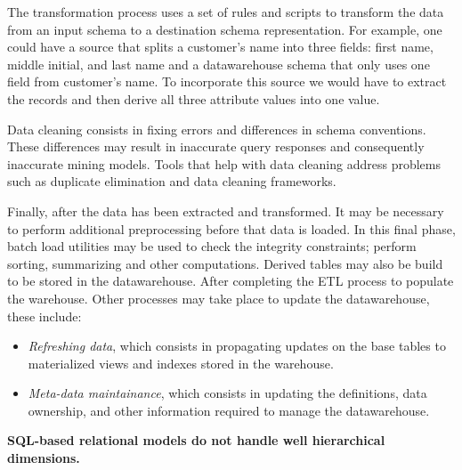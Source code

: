 \documentclass[]{article}
\begin{document}
The transformation process uses a set of rules and scripts to transform the data from an input schema to a destination schema
representation. For example, one could have a source that splits a customer's name into three fields: first name, middle initial, and
last name and a datawarehouse schema that only uses one field from customer's name. To incorporate this source we would have to extract
the records and then derive all three attribute values into one value. 

Data cleaning consists in fixing errors and differences in schema conventions. These differences may result in inaccurate query
responses and consequently inaccurate mining models. Tools that help with data cleaning address problems such as duplicate elimination
and data cleaning frameworks.

Finally, after the data has been extracted and transformed. It may be necessary to perform additional preprocessing before that data is
loaded. In this final phase, batch load utilities may be used to check the integrity constraints; perform sorting, summarizing and other
computations. Derived tables may also be build to be stored in the datawarehouse. After completing the ETL process to populate the
warehouse. Other processes may take place to update the datawarehouse, these include:
\begin{itemize}
	\item \emph{Refreshing data}, which consists in propagating updates on the base tables to materialized views and indexes stored in the warehouse.
	\item \emph{Meta-data maintainance}, which consists in updating the definitions, data ownership, and other information required to manage the datawarehouse. 
\end{itemize}


\textbf{SQL-based
relational models do not handle well hierarchical dimensions.}




\end{document}
